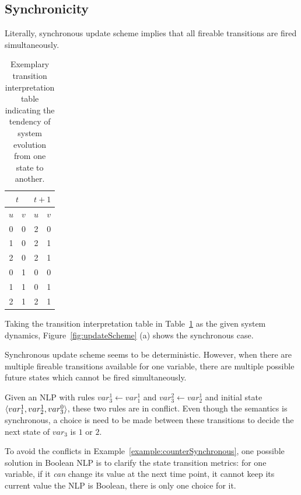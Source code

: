 

\subsection{Synchronicity}
Literally, synchronous update scheme implies that all fireable transitions are fired simultaneously.

\begin{table}[ht]
    \centering
    \begin{tabular}{cc|cc}
        \multicolumn{2}{c|}{$t$}&\multicolumn{2}{c}{$t+1$}\\
        \hline
        $u$ & $v$ & $u$ & $v$ \\
        \hline
        0 & 0 & 2 & 0 \\
        1 & 0 & 2 & 1 \\
        2 & 0 & 2 & 1 \\
        0 & 1 & 0 & 0 \\
        1 & 1 & 0 & 1 \\
        2 & 1 & 2 & 1 \\
    \end{tabular}
    \caption{Exemplary transition interpretation table indicating the tendency of system evolution from one state to another.}
    \label{tab:transTable}
\end{table}


\begin{example}
Taking the transition interpretation table in Table~\ref{tab:transTable} as the given system dynamics, Figure~\ref{fig:updateScheme} (a) shows the synchronous case. 
\end{example}


Synchronous update scheme seems to be deterministic. 
However, when there are multiple fireable transitions available for one variable, there are multiple possible future states which cannot be fired simultaneously. 

\begin{example}\label{example:counterSynchronous}
Given an NLP with rules $var_3^1\gets var_1^1$ and $var_3^2 \gets var_2^1$
and initial state $\langle var_1^1, var_2^1, var_3^0\rangle$,
these two rules are in conflict.
Even though the semantics is synchronous, a choice is need to be made between these transitions to decide the next state of $var_3$ is $1$ or $2$.
\end{example}

To avoid the conflicts in Example~\ref{example:counterSynchronous}, one possible solution in Boolean NLP is to clarify the state transition metrics:
for one variable, if it \textit{can} change its value at the next time point, it cannot keep its current value the NLP is Boolean, there is only one choice for it.


